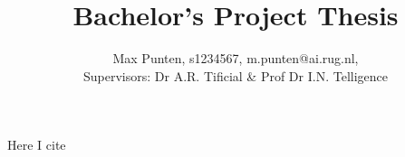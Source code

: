 \documentclass[10pt,a4paper,twocolumn]{article}
\title{\vspace{-0.5in}{\bfseries\scshape
    Bachelor's thesis Template - Title of project
    } \\
    \vspace{1ex}
    \normalsize{Bachelor's Project Thesis}\vspace{-2ex}
}
\author{
    \normalsize{Max Punten, s1234567, m.punten@ai.rug.nl,} \\
    \normalsize{Supervisors: Dr A.R. Tificial \& Prof Dr I.N. Telligence}
}
\date{\vspace{-5ex}}
\begin{document}
\twocolumn[
  \maketitle
  \begin{@twocolumnfalse}
    
  \end{@twocolumnfalse}
]

\thispagestyle{firststyle}


Here I cite \cite{kumar2019stabilizing}




\clearpage

\begin{appendices}
    
    \newpage
    
    \newpage
\end{appendices}
\end{document}

